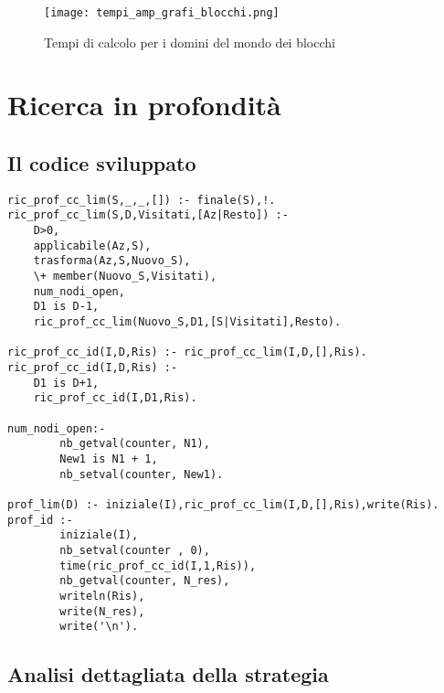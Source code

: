 \begin{figure}[htp]
  \texttt{[image: tempi\_amp\_grafi\_blocchi.png]}
  \caption{Tempi di calcolo per i domini del mondo dei blocchi}
  \label{fig:figure4}
\end{figure}

\section{Ricerca in profondità}

\subsection{Il codice sviluppato}

\begin{lstlisting}
ric_prof_cc_lim(S,_,_,[]) :- finale(S),!.
ric_prof_cc_lim(S,D,Visitati,[Az|Resto]) :-
    D>0,
    applicabile(Az,S),
    trasforma(Az,S,Nuovo_S),
    \+ member(Nuovo_S,Visitati),
    num_nodi_open,
    D1 is D-1,
    ric_prof_cc_lim(Nuovo_S,D1,[S|Visitati],Resto).

ric_prof_cc_id(I,D,Ris) :- ric_prof_cc_lim(I,D,[],Ris).
ric_prof_cc_id(I,D,Ris) :-
    D1 is D+1,
    ric_prof_cc_id(I,D1,Ris).

num_nodi_open:-
        nb_getval(counter, N1),
        New1 is N1 + 1,
        nb_setval(counter, New1).

prof_lim(D) :- iniziale(I),ric_prof_cc_lim(I,D,[],Ris),write(Ris).
prof_id :-
        iniziale(I),
        nb_setval(counter , 0),
        time(ric_prof_cc_id(I,1,Ris)),
        nb_getval(counter, N_res),
        writeln(Ris),
        write(N_res),
        write('\n').
\end{lstlisting}

\subsection{Analisi dettagliata della strategia}

